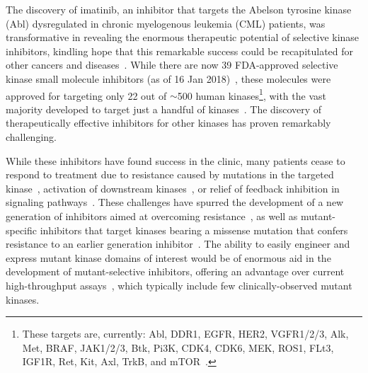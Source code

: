 \documentclass[phd,tocprelim]{cornell}
\begin{document}
The discovery of imatinib, an inhibitor that targets the Abelson tyrosine kinase (Abl) dysregulated in chronic myelogenous leukemia (CML) patients,
was transformative in revealing the enormous therapeutic potential of selective kinase inhibitors, kindling hope that this remarkable success could be recapitulated for other cancers and diseases~\citep{stegmeier:clpt:2010:imatinib-lessons}.
While there are now 39 FDA-approved selective kinase small molecule inhibitors (as of 16 Jan 2018)~\citep{wu_fda-approved_2015,fda-approved-kinase-inhibitors}, these molecules were approved for targeting only 22 out of $\sim$500 human kinases\footnote{These targets are, currently: Abl, DDR1, EGFR, HER2, VGFR1/2/3, Alk, Met, BRAF, JAK1/2/3, Btk, Pi3K, CDK4, CDK6, MEK, ROS1, FLt3, IGF1R, Ret, Kit, Axl, TrkB, and mTOR~\cite{fda-approved-kinase-inhibitors}.}, with the vast majority developed to target just a handful of kinases~\citep{doi:10.1021/ci500624s}. 
The discovery of therapeutically effective inhibitors for other kinases has proven remarkably challenging.

While these inhibitors have found success in the clinic, many patients cease to respond to treatment due to resistance caused by mutations in the targeted kinase~\citep{Pao:2005dp}, activation of downstream kinases~\citep{knight_targeting_2010}, or relief of feedback inhibition in signaling pathways~\citep{chandarlapaty_akt_2011}. 
These challenges have spurred the development of a new generation of inhibitors aimed at overcoming resistance~\citep{Jia:2016di,Politi:2015fg}, as well as mutant-specific inhibitors that target kinases bearing a missense mutation that confers resistance to an earlier generation inhibitor~\citep{Song:2015gu}. 
The ability to easily engineer and express mutant kinase domains of interest would be of enormous aid in the development of mutant-selective inhibitors, offering an advantage over current high-throughput assays~\citep{karaman:nature-biotech:2008:kinase-selectivity-map,Davis:2011fz,Medard:2015hv}, which typically include few clinically-observed mutant kinases. 
\end{document}
